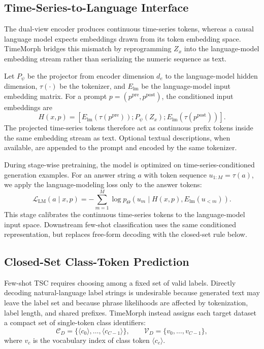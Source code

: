 \documentclass{article}
\begin{document}
\subsection{Time-Series-to-Language Interface}
\label{sec:ts-token-conditioning}

The dual-view encoder produces continuous time-series tokens, whereas a causal
language model expects embeddings drawn from its token embedding space. TimeMorph
bridges this mismatch by reprogramming $Z_x$ into the language-model embedding
stream rather than serializing the numeric sequence as text.

Let $P_\psi$ be the projector from encoder dimension $d_e$ to the language-model
hidden dimension, $\tau(\cdot)$ be the tokenizer, and $E_{\mathrm{lm}}$ be the
language-model input embedding matrix. For a prompt
$p=(p^{\mathrm{pre}},p^{\mathrm{post}})$, the conditioned input embeddings are
\begin{equation}
\label{eq:conditioned-input}
H(x,p)=
\left[
E_{\mathrm{lm}}(\tau(p^{\mathrm{pre}}));
P_{\psi}(Z_x);
E_{\mathrm{lm}}(\tau(p^{\mathrm{post}}))
\right].
\end{equation}
The projected time-series tokens therefore act as continuous prefix tokens inside
the same embedding stream as text. Optional textual descriptions, when available,
are appended to the prompt and encoded by the same tokenizer.

During stage-wise pretraining, the model is optimized on time-series-conditioned
generation examples. For an answer string $a$ with token sequence
$u_{1:M}=\tau(a)$, we apply the language-modeling loss only to the answer tokens:
\begin{equation}
\label{eq:answer-lm}
\mathcal{L}_{\mathrm{LM}}(a\mid x,p)
=
-\sum_{m=1}^{M}
\log p_{\Theta}
\left(
 u_m
 \mid
 H(x,p), E_{\mathrm{lm}}(u_{<m})
\right).
\end{equation}
This stage calibrates the continuous time-series tokens to the language-model
input space. Downstream few-shot classification uses the same conditioned
representation, but replaces free-form decoding with the closed-set rule below.

\subsection{Closed-Set Class-Token Prediction}
\label{sec:class-token-classification}

Few-shot TSC requires choosing among a fixed set of valid labels. Directly
decoding natural-language label strings is undesirable because generated text may
leave the label set and because phrase likelihoods are affected by tokenization,
label length, and shared prefixes. TimeMorph instead assigns each target dataset
a compact set of single-token class identifiers:
\begin{equation}
\label{eq:class-token-set}
\mathcal{C}_D
=
\{
\langle c_0\rangle,\ldots,\langle c_{C-1}\rangle
\},
\qquad
\mathcal{V}_D
=
\{
v_0,\ldots,v_{C-1}
\},
\end{equation}
where $v_c$ is the vocabulary index of class token $\langle c_c\rangle$.
\end{document}
